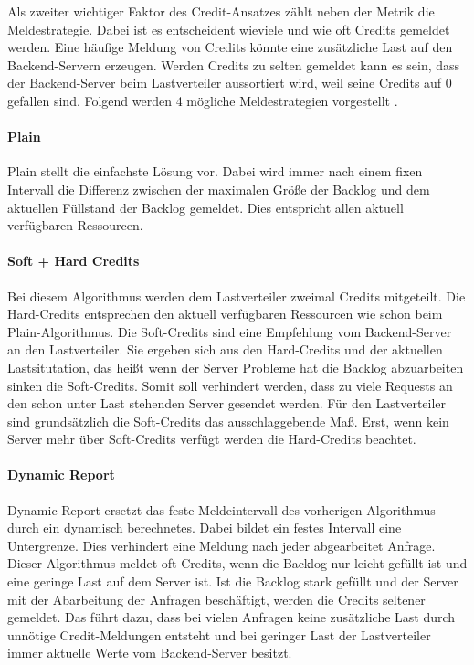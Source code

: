 \documentclass[a4paper, 12pt, BCOR10mm, DIV12, toc=bibliography, toc=listof, german]{scrbook}
\begin{document}
	Als zweiter wichtiger Faktor des Credit-Ansatzes zählt neben der Metrik die Meldestrategie. Dabei
	ist es entscheident wieviele und wie oft Credits gemeldet werden. Eine häufige Meldung von Credits
	könnte eine zusätzliche Last auf den Backend-Servern erzeugen. Werden Credits zu selten gemeldet
	kann es sein, dass der Backend-Server beim Lastverteiler aussortiert wird, weil seine Credits auf
	0 gefallen sind. Folgend werden 4 mögliche Meldestrategien vorgestellt \cite{scsczile2008,
	schneidenbach2009}.
	
	\paragraph{Plain} %
	\label{par:plain}

		Plain stellt die einfachste Lösung vor. Dabei wird immer nach einem fixen Intervall die
		Differenz zwischen der maximalen Größe der Backlog und dem aktuellen Füllstand der Backlog
		gemeldet. Dies entspricht allen aktuell verfügbaren Ressourcen.


	\paragraph{Soft + Hard Credits} %
	\label{par:soft-hard-credits}

	Bei diesem Algorithmus werden dem Lastverteiler zweimal Credits mitgeteilt. Die Hard-Credits
	entsprechen den aktuell verfügbaren Ressourcen wie schon beim Plain-Algorithmus. Die Soft-Credits
	sind eine Empfehlung vom Backend-Server an den Lastverteiler. Sie ergeben sich aus den
	Hard-Credits und der aktuellen Lastsitutation, das heißt wenn der Server Probleme hat die Backlog
	abzuarbeiten sinken die Soft-Credits. Somit soll verhindert werden, dass zu viele Requests an den
	schon unter Last stehenden Server gesendet werden. Für den Lastverteiler sind grundsätzlich die
	Soft-Credits das ausschlaggebende Maß. Erst, wenn kein Server mehr über Soft-Credits verfügt
	werden die Hard-Credits beachtet.
	

	\paragraph{Dynamic Report} %
	\label{par:dynamic-report}

	Dynamic Report ersetzt das feste Meldeintervall des vorherigen Algorithmus durch ein dynamisch
	berechnetes. Dabei bildet ein festes Intervall eine Untergrenze. Dies verhindert eine Meldung nach
	jeder abgearbeitet Anfrage. Dieser Algorithmus meldet oft Credits, wenn die Backlog nur leicht
	gefüllt ist und eine geringe Last	auf dem Server ist. Ist die Backlog stark gefüllt und der
	Server mit der Abarbeitung der Anfragen beschäftigt, werden die Credits seltener gemeldet. Das
	führt dazu, dass bei vielen Anfragen keine zusätzliche Last durch unnötige Credit-Meldungen entsteht
	und bei geringer Last der Lastverteiler immer aktuelle Werte vom Backend-Server besitzt.
	
\end{document}
